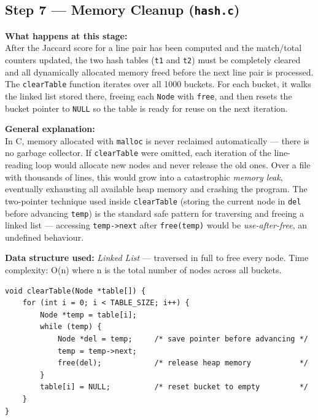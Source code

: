 \documentclass[12pt,a4paper]{article}
\begin{document}
\subsection{Step 7 — Memory Cleanup (\texttt{hash.c})}

\textbf{What happens at this stage:}\\
After the Jaccard score for a line pair has been computed and the match/total counters updated, the two hash tables (\texttt{t1} and \texttt{t2}) must be completely cleared and all dynamically allocated memory freed before the next line pair is processed. The \texttt{clearTable} function iterates over all 1000 buckets. For each bucket, it walks the linked list stored there, freeing each \texttt{Node} with \texttt{free}, and then resets the bucket pointer to \texttt{NULL} so the table is ready for reuse on the next iteration.

\smallskip
\textbf{General explanation:}\\
In C, memory allocated with \texttt{malloc} is never reclaimed automatically — there is no garbage collector. If \texttt{clearTable} were omitted, each iteration of the line-reading loop would allocate new nodes and never release the old ones. Over a file with thousands of lines, this would grow into a catastrophic \textit{memory leak}, eventually exhausting all available heap memory and crashing the program. The two-pointer technique used inside \texttt{clearTable} (storing the current node in \texttt{del} before advancing \texttt{temp}) is the standard safe pattern for traversing and freeing a linked list — accessing \texttt{temp->next} after \texttt{free(temp)} would be \textit{use-after-free}, an undefined behaviour.

\smallskip
\textbf{Data structure used:} \textit{Linked List} — traversed in full to free every node. Time complexity: O(n) where n is the total number of nodes across all buckets.

\begin{lstlisting}[caption={\texttt{hash.c} -- \texttt{clearTable}: free all nodes and reset the hash table}]
void clearTable(Node *table[]) {
    for (int i = 0; i < TABLE_SIZE; i++) {
        Node *temp = table[i];
        while (temp) {
            Node *del = temp;     /* save pointer before advancing */
            temp = temp->next;
            free(del);            /* release heap memory           */
        }
        table[i] = NULL;          /* reset bucket to empty         */
    }
}
\end{lstlisting}
\end{document}
